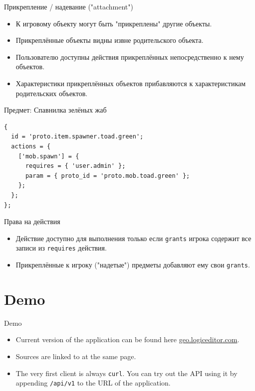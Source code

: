 \documentclass[aspectratio=169,handout,bigger]{beamer}
\begin{document}
\begin{frame}{Прикрепление / надевание ("attachment")}
  \begin{itemize}
    \item К игровому объекту могут быть "прикреплены" другие объекты.
    \item Прикреплённые объекты видны извне родительского объекта.
    \item Пользователю доступны действия
          прикреплённых непосредственно к нему объектов.
    \item Характеристики прикреплённых объектов прибавляются
          к характеристикам родительских объектов.
  \end{itemize}
\end{frame}


\begin{frame}[fragile]{Предмет: Спавнилка зелёных жаб}
\begin{verbatim}
{
  id = 'proto.item.spawner.toad.green';
  actions = {
    ['mob.spawn'] = {
      requires = { 'user.admin' };
      param = { proto_id = 'proto.mob.toad.green' };
    };
  };
};
\end{verbatim}
\end{frame}


\begin{frame}{Права на действия}
  \begin{itemize}
    \item Действие доступно для выполнения только если \texttt{grants} игрока
          содержит все записи из \texttt{requires} действия.
    \item Прикреплённые к игроку ("надетые") предметы
          добавляют ему свои \texttt{grants}.
  \end{itemize}
\end{frame}


\section{Demo}


\begin{frame}{Demo}
  \begin{itemize}
    \item Current version of the application can be found here
          \href{https://geo.logiceditor.com/}{geo.logiceditor.com}.
    \item Sources are linked to at the same page.
    \item The very first client is always \texttt{curl}.
          You can try out the API using it by appending
          \texttt{/api/v1} to the URL of the application.
  \end{itemize}
\end{frame}
\end{document}
